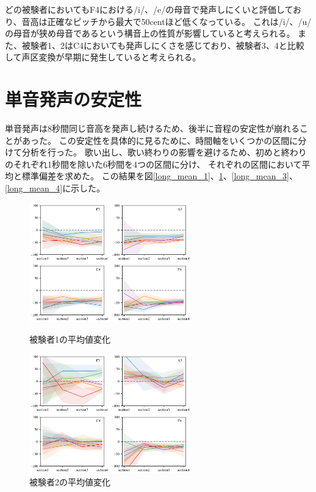 \documentclass[10.5ptj,a4j,dvipdfmx,uplatex, oneside, openany, report]{jsbook}%
\begin{document}
どの被験者においてもF4における/i/、/e/の母音で発声しにくいと評価しており、音高は正確なピッチから最大で50centほど低くなっている。
これは/i/、/u/の母音が狭め母音であるという構音上の性質が影響していると考えられる。
また、被験者1、2はC4においても発声しにくさを感じており、被験者3、4と比較して声区変換が早期に発生していると考えられる。




\section{単音発声の安定性}
単音発声は8秒間同じ音高を発声し続けるため、後半に音程の安定性が崩れることがあった。
この安定性を具体的に見るために、時間軸をいくつかの区間に分けて分析を行った。
歌い出し、歌い終わりの影響を避けるため、初めと終わりのそれぞれ1秒間を除いた6秒間を4つの区間に分け、
それぞれの区間において平均と標準偏差を求めた。
この結果を図\ref{long_mean_1}、\ref{long_mean_2}、\ref{long_mean_3}、\ref{long_mean_4}に示した。


\begin{figure}[thbp]
    \begin{minipage}{0.5\hsize}
        \begin{center}
            \includegraphics[clip,width=7.0cm]{long_mean_1.png}
          \end{center}
     \caption{被験者1の平均値変化}
     \label{long_mean_1}
    \end{minipage}
    \begin{minipage}{0.5\hsize}
        \begin{center}
            \includegraphics[clip,width=7.0cm]{long_mean_2.png}
          \end{center}
     \caption{被験者2の平均値変化}
     \label{long_mean_2}
    \end{minipage}
\end{figure}
\end{document}

